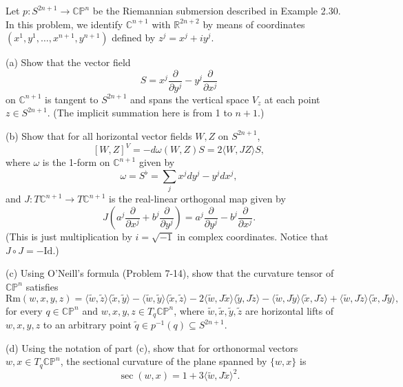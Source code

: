 \begin{exercise}
\label{prob:complex-projective-space-curvature}
Let $p: S^{2n+1} \to \mathbb{CP}^n$ be the Riemannian submersion described in Example 2.30. In this problem, we identify $\mathbb{C}^{n+1}$ with $\mathbb{R}^{2n+2}$ by means of coordinates $(x^1, y^1, \ldots, x^{n+1}, y^{n+1})$ defined by $z^j = x^j + iy^j$.

(a) Show that the vector field
\[
S = x^j \frac{\partial}{\partial y^j} - y^j \frac{\partial}{\partial x^j}
\]
on $\mathbb{C}^{n+1}$ is tangent to $S^{2n+1}$ and spans the vertical space $V_z$ at each point $z \in S^{2n+1}$. (The implicit summation here is from 1 to $n+1$.)

(b) Show that for all horizontal vector fields $W, Z$ on $S^{2n+1}$,
\[
[W, Z]^V = -d\omega(W, Z)S = 2\langle W, JZ \rangle S,
\]
where $\omega$ is the 1-form on $\mathbb{C}^{n+1}$ given by
\[
\omega = S^\flat = \sum_j x^j dy^j - y^j dx^j,
\]
and $J: T\mathbb{C}^{n+1} \to T\mathbb{C}^{n+1}$ is the real-linear orthogonal map given by
\[
J\left(a^j \frac{\partial}{\partial x^j} + b^j \frac{\partial}{\partial y^j}\right) = a^j \frac{\partial}{\partial y^j} - b^j \frac{\partial}{\partial x^j}.
\]
(This is just multiplication by $i = \sqrt{-1}$ in complex coordinates. Notice that $J \circ J = -\text{Id}$.)

(c) Using O'Neill's formula (Problem 7-14), show that the curvature tensor of $\mathbb{CP}^n$ satisfies
\[
\text{Rm}(w, x, y, z) = \langle \tilde{w}, \tilde{z} \rangle \langle \tilde{x}, \tilde{y} \rangle - \langle \tilde{w}, \tilde{y} \rangle \langle \tilde{x}, \tilde{z} \rangle
- 2\langle \tilde{w}, J\tilde{x} \rangle \langle \tilde{y}, J\tilde{z} \rangle - \langle \tilde{w}, J\tilde{y} \rangle \langle \tilde{x}, J\tilde{z} \rangle
+ \langle \tilde{w}, J\tilde{z} \rangle \langle \tilde{x}, J\tilde{y} \rangle,
\]
for every $q \in \mathbb{CP}^n$ and $w, x, y, z \in T_q\mathbb{CP}^n$, where $\tilde{w}, \tilde{x}, \tilde{y}, \tilde{z}$ are horizontal lifts of $w, x, y, z$ to an arbitrary point $\tilde{q} \in p^{-1}(q) \subseteq S^{2n+1}$.

(d) Using the notation of part (c), show that for orthonormal vectors $w, x \in T_q\mathbb{CP}^n$, the sectional curvature of the plane spanned by $\{w, x\}$ is
\[
\sec(w, x) = 1 + 3\langle \tilde{w}, J\tilde{x} \rangle^2.
\]
\end{exercise}


